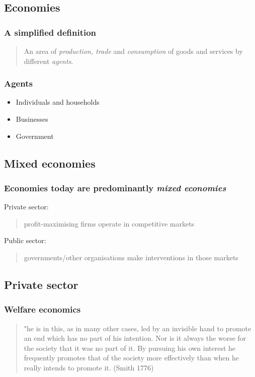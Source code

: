 \documentclass[class=report, crop=false, 12pt,a4paper]{standalone}
\begin{document}
\subsection{Economies}
\subsubsection{A simplified definition}
\begin{quote}
	An area of \textit{production, trade} and \textit{consumption} of goods and services by different \textit{agents}.
\end{quote}
\subsubsection{Agents}
\begin{itemize}
	\item Individuals and households
	\item Businesses
	\item Government
\end{itemize}
\subsection{Mixed economies}
\subsubsection{Economies today are predominantly \textit{mixed economies}}
Private sector:
\begin{quote}
	profit-maximising firms operate in competitive markets
\end{quote}
Public sector:
\begin{quote}
	governments/other organisations make interventions in those markets
\end{quote}
\subsection{Private sector}
\subsubsection{Welfare economics}
\begin{quote}
	"he is in this, as in many other cases, led by an invisible hand to promote an end which has no part of his intention. Nor is it always the worse for the society that it was no part of it. By pursuing his own interest he frequently promotes that of the society more effectively than when he really intends to promote it. (Smith 1776)
\end{quote}
\end{document}
